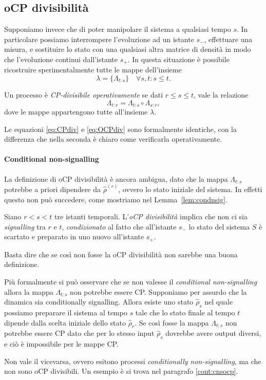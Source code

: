 \documentclass[a4]{article}
\begin{document}
\subsection{oCP divisibilità}
Supponiamo invece che di poter manipolare il sistema a qualsiasi tempo \(s\). In
particolare possiamo interrompere l'evoluzione ad un istante \(s_-\), effettuare una
misura, e sostituire lo stato con una qualsiasi altra matrice di densità in modo che
l'evoluzione continui dall'istante \(s_+\). In questa situazione è  possibile  ricostruire
sperimentalmente tutte le mappe dell'insieme
\[\lambda = \{\Lambda_{t\colon s}\}  \quad \forall s,t\colon s \le t.\]  
\begin{defn}
Un processo è \emph{CP-divisibile operativamente} se dati \(r \le s \le  t\), vale la
relazione 
\begin{equation} \label{eq:OCPdiv}
\Lambda_{t\colon r} = \Lambda_{t\colon s} \circ \Lambda_{s\colon r},
\end{equation}
dove le mappe appartengono tutte all'insieme \(\lambda\).
\end{defn}
Le equazioni \eqref{eq:CPdiv} e \eqref{eq:OCPdiv} sono formalmente identiche, con la
differenza che nella seconda è chiaro come verificarla operativamente.

\paragraph{Conditional non-signalling}
La definizione di oCP divisibilità è ancora ambigua, dato che la mappa \(\Lambda_{t\colon s}\)
potrebbe a priori dipendere da \(\hat{\rho}^{(r)}\), ovvero lo stato iniziale del sistema.
In effetti questo non può succedere, come mostriamo nel Lemma~\ref{lem:condnsig}.
\begin{lem}  \label{lem:condnsig}
	Siano \(r<s<t\) tre istanti temporali. L'\emph{oCP divisibilità} implica che non ci
	sia \emph{signalling} tra \(r\) e \(t\), \emph{condizionato} al fatto che all'istante
	\(s_-\) lo stato del sistema \(S\) è scartato e preparato in uno nuovo all'istante \(s_+\).
	
	\proof Basta dire che se così non fosse la oCP divisibilità non sarebbe una buona
	definizione. 
	
	Più formalmente si può osservare che se non valesse il \emph{conditional non-signalling}
	allora la mappa \(\Lambda_{t\colon s}\) non potrebbe essere CP. 
	Supponiamo per assurdo che la dinamica sia conditionally signalling. Allora esiste
	uno stato \(\hat{\rho}_s\) nel quale possiamo preparare il sistema al tempo \(s\)
	tale che lo stato finale al tempo \(t\) dipende dalla scelta iniziale dello stato
	 \(\hat{\rho}_r\). Se così fosse la mappa \(\Lambda_{t\colon s}\) non potrebbe essere
	 CP dato che per lo stesso input \(\hat{\rho}_s\) dovrebbe avere output diversi, e ciò
	 è impossibile per le mappe CP.
\end{lem}
\begin{ach}
	Non vale il vicevarsa, ovvero esitono processi \emph{conditionally non-signalling}, ma
	che non sono oCP divisibili. Un esempio è si trova nel paragrafo \ref{cont:cnsocp}.
\end{ach}
\end{document}
